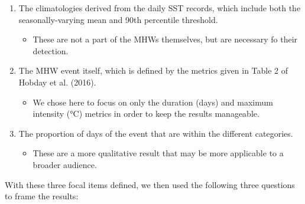 \documentclass[]{article}
\providecommand{\tightlist}{%
  \setlength{\itemsep}{0pt}\setlength{\parskip}{0pt}}
\begin{document}
\begin{enumerate}
\def\labelenumi{\arabic{enumi})}
\tightlist
\item
  The climatologies derived from the daily SST records, which include
  both the seasonally-varying mean and 90th percentile threshold.

  \begin{itemize}
  \tightlist
  \item
    These are not a part of the MHWs themselves, but are necessary fo
    their detection.
  \end{itemize}
\item
  The MHW event itself, which is defined by the metrics given in Table 2
  of Hobday et al. (2016).

  \begin{itemize}
  \tightlist
  \item
    We chose here to focus on only the duration (days) and maximum
    intensity (°C) metrics in order to keep the results manageable.
  \end{itemize}
\item
  The proportion of days of the event that are within the different
  categories.

  \begin{itemize}
  \tightlist
  \item
    These are a more qualitative result that may be more applicable to a
    broader audience.
  \end{itemize}
\end{enumerate}

With these three focal items defined, we then used the following three
questions to frame the results:
\end{document}
